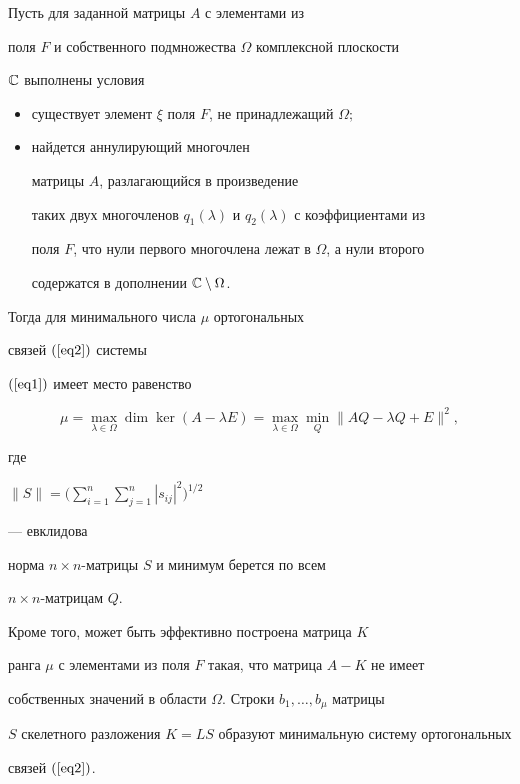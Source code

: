 \begin{thm}


Пусть для заданной матрицы $A$ с элементами из


поля $F$  и собственного подмножества $\Omega$ комплексной плоскости 


$\Bbb C$ выполнены условия


\begin{itemize}


\item[a)] существует элемент $\xi$ поля $F$, не принадлежащий $\Omega;$


\item[б)] найдется аннулирующий многочлен 


матрицы $A$, разлагающийся в произведение


таких двух многочленов $q_1(\lambda)$ и $q_2(\lambda)$ с коэффициентами из


поля $F$, что нули первого многочлена лежат в $\Omega$, а нули второго


содержатся в дополнении $\Bbb C\setminus\Omega$.


\end{itemize}


Тогда для минимального числа $\mu$ ортогональных


связей $(\ref{eq2})$ системы


$(\ref{eq1})$ имеет место равенство 


$$


\mu =\max_{\lambda\in\Omega}\dim\ker(A-\lambda E)=


\max_{\lambda\in\Omega}\min_Q\|AQ-\lambda Q+E\|^2,


$$


где


$\|S\|=\Big(\sum\limits_{i=1}^n\sum\limits_{j=1}^n |s_{ij}|^2\Big)^{1/2}$


--- евклидова 


норма $n\times n$-матрицы $S$ и минимум берется по всем


$n\times n$-матрицам $Q$. 





Кроме того, может быть эффективно построена матрица $K$


ранга $\mu$ с элементами из поля $F$ такая, что матрица $A - K$ не имеет


собственных значений в области $\Omega$. Строки $b_1,\dotsc,b_\mu$ матрицы


$S$ скелетного разложения $K = LS$ образуют минимальную систему ортогональных


связей $(\ref{eq2})$.


\end{thm}





